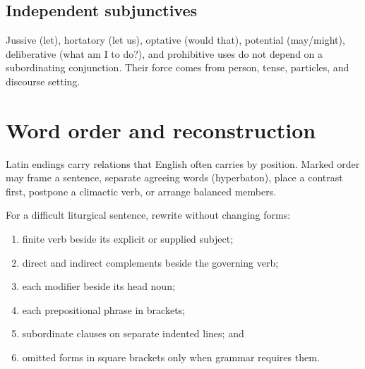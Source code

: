 \section{Independent subjunctives}


Jussive (let), hortatory (let us), optative (would that), potential (may/might),
deliberative (what am I to do?), and prohibitive uses do not depend on a
subordinating conjunction. Their force comes from person, tense, particles,
and discourse setting.

\chapter{Word order and reconstruction}




Latin endings carry relations that English often carries by position. Marked
order may frame a sentence, separate agreeing words (hyperbaton), place a
contrast first, postpone a climactic verb, or arrange balanced members.

For a difficult liturgical sentence, rewrite without changing forms:

\begin{enumerate}
  \item finite verb beside its explicit or supplied subject;
  \item direct and indirect complements beside the governing verb;
  \item each modifier beside its head noun;
  \item each prepositional phrase in brackets;
  \item subordinate clauses on separate indented lines; and
  \item omitted forms in square brackets only when grammar requires them.
\end{enumerate}

